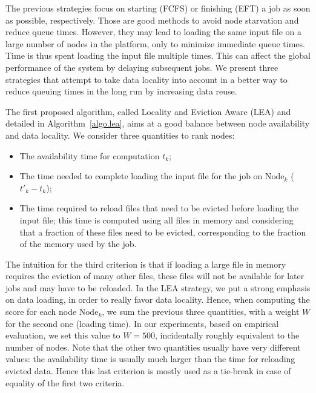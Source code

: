 \documentclass[conference]{IEEEtran}
\newcommand{\Node}[1]{\ensuremath{\mathrm{Node}_{#1}}\xspace}
\begin{document}
The previous strategies focus on starting (FCFS) or finishing (EFT) a job
as soon as possible, respectively.  Those are good methods
to avoid node starvation and reduce queue times.  However, they
may lead to loading the same input file on a large number of nodes in
the platform, only to minimize immediate queue times. Time is thus spent
loading the input file multiple times. This can affect the global
performance of the system by delaying subsequent jobs.  We present three
strategies that attempt to take data locality into account in a better way to reduce queuing times in the long run by increasing data reuse.

The first proposed algorithm, called Locality and Eviction Aware (LEA)
and detailed in Algorithm~\ref{algo.lea}, aims at a good balance
between node availability and data locality.  We consider three
quantities to rank nodes:
\begin{itemize}
\item The availability time for computation $t_k$;
\item The time needed to complete loading the input file for the job
  on \Node{k} ($t'_k - t_k$);
\item The time required to reload files that need to be evicted before
  loading the input file; this time is computed using all files in
  memory and considering that a fraction of these files need to be
  evicted, corresponding to the fraction of the memory used by the job.
\end{itemize}

The intuition for the third criterion is that if loading a large file
in memory requires the eviction of many other files, these files will not
be available for later jobs and may have to be reloaded.
In the LEA strategy, we put a strong emphasis on data loading, in order
to really favor data locality. Hence, when computing the score for
each node \Node{k}, we sum the previous three quantities, with a weight
$W$ for the second one (loading time). In our experiments, based on
empirical evaluation, we set this value to $W=500$, incidentally roughly
equivalent to the number of nodes.
Note that the other two quantities usually have very different values:
the availability time is usually much larger than the time for
reloading evicted data. Hence this last criterion is mostly used as a
tie-break in case of equality of the first two criteria.
\end{document}
